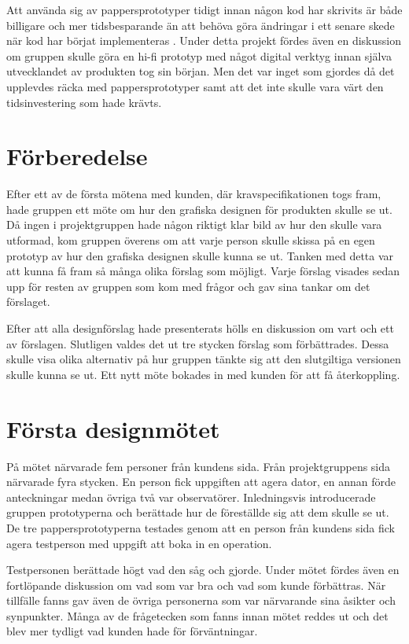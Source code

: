 Att använda sig av pappersprototyper tidigt innan någon kod har skrivits är både billigare och mer tidsbesparande än att behöva göra ändringar i ett senare skede när kod har börjat implementeras \cite{paper}. Under detta projekt fördes även en diskussion om gruppen skulle göra en hi-fi prototyp med något digital verktyg innan själva utvecklandet av produkten tog sin början. Men det var inget som gjordes då det upplevdes räcka med pappersprototyper samt att det inte skulle vara värt den tidsinvestering som hade krävts.      

\section{Förberedelse}
Efter ett av de första mötena med kunden, där kravspecifikationen togs fram, hade gruppen ett möte om hur den grafiska designen för produkten skulle se ut. Då ingen i projektgruppen hade någon riktigt klar bild av hur den skulle vara utformad, kom gruppen överens om att varje person skulle skissa på en egen prototyp av hur den grafiska designen skulle kunna se ut. Tanken med detta var att kunna få fram så många olika förslag som möjligt. Varje förslag visades sedan upp för resten av gruppen som kom med frågor och gav sina tankar om det förslaget.

Efter att alla designförslag hade presenterats hölls en diskussion om vart och ett av förslagen. Slutligen valdes det ut tre stycken förslag som förbättrades. Dessa skulle visa olika alternativ på hur gruppen tänkte sig att den slutgiltiga versionen skulle kunna se ut. Ett nytt möte bokades in med kunden för att få återkoppling. 

\section{Första designmötet}
På mötet närvarade fem personer från kundens sida. Från projektgruppens sida närvarade fyra stycken. En person fick uppgiften att agera dator, en annan förde anteckningar medan övriga två var observatörer. Inledningsvis introducerade gruppen prototyperna och berättade hur de föreställde sig att dem skulle se ut. De tre pappersprototyperna testades genom att en person från kundens sida fick agera testperson med uppgift att boka in en operation.

Testpersonen berättade högt vad den såg och gjorde. Under mötet fördes även en fortlöpande diskussion om vad som var bra och vad som kunde förbättras. När tillfälle fanns gav även de övriga personerna som var närvarande sina åsikter och synpunkter. Många av de frågetecken som fanns innan mötet reddes ut och det blev mer tydligt vad kunden hade för förväntningar. 

